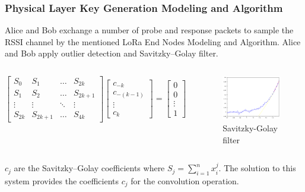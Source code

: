 \documentclass{beamer}
\begin{document}
\begin{frame}
  \frametitle{Physical Layer Key Generation Modeling and Algorithm}
  Alice and Bob exchange a number of probe and response packets to sample the RSSI channel by the mentioned LoRa End Nodes Modeling and Algorithm. Alice and Bob apply outlier detection and Savitzky–Golay filter.
  \begin{columns}
  \begin{equation}
    \begin{bmatrix}
      S_0 & S_1 & \ldots & S_{2k} \\
      S_1 & S_2 & \ldots & S_{2k+1} \\
      \vdots & \vdots & \ddots & \vdots \\
      S_{2k} & S_{2k+1} & \ldots & S_{4k}
    \end{bmatrix}
    \begin{bmatrix}
      c_{-k} \\
      c_{-(k-1)} \\
      \vdots \\
      c_k
    \end{bmatrix}
    =
    \begin{bmatrix}
      0 \\
      0 \\
      \vdots \\
      1
    \end{bmatrix}
    \end{equation}

    \begin{figure}
      \centering
      \includegraphics[width=0.6\linewidth]{../figures/fig3-6.png}
      \caption{Savitzky-Golay filter}
      \label{fig:3-6}
    \end{figure}
  \end{columns}
  \(c_j\) are the Savitzky–Golay coefficients where \(S_j = \sum_{i=1}^{n} x_i^j\). The solution to this system provides the coefficients \(c_j\) for the convolution operation.
\end{frame}
\end{document}
